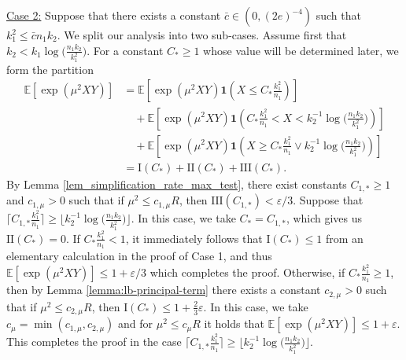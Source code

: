 \documentclass{article}
\newcommand{\EE}{\mathbb{E}}
\newcommand{\one}{\mathbf{1}}
\newcommand{\eps}{\varepsilon} %
\newcommand{\Ct}{C_{*}}
\begin{document}
\noindent \underline{Case 2:} Suppose that there exists a constant $\bar{c} \in (0, (2e)^{-4})$ such that $k_1^2 \leq \bar{c}n_1k_2$. We split our analysis into two sub-cases. Assume first that $k_2 < k_1\log\big(\frac{n_1k_2}{k_1^2}\big)$. For a constant $C_* \geq 1$ whose value will be determined later, we form the partition
\begin{align*}
    \EE[\exp(\mu^2XY)] &= \EE[\exp(\mu^2XY)\one(X \leq \Ct \frac{k_1^2}{n_1})] \\
    &\quad +  \EE[\exp(\mu^2XY)\one(\Ct \frac{k_1^2}{n_1} < X < k_2^{-1}\log\big(\frac{n_1k_2}{k_1^2}\big))] \\
    &\quad + \EE[\exp(\mu^2XY)\one(X \geq \Ct \frac{k_1^2}{n_1} \lor k_2^{-1}\log\big(\frac{n_1k_2}{k_1^2}\big) )] \\
    &= \text{I}(C_*) + \text{II}(C_*) + \text{III}(C_*).
\end{align*}
By Lemma \ref{lem_simplification_rate_max_test}, there exist constants $C_{1,*} \geq 1$ and $c_{1, \mu} > 0$ such that if $\mu^2 \leq c_{1, \mu}R$, then $\text{III}(C_{1,*}) < \eps/3$. Suppose that $\lceil C_{1,*}\frac{k_1^2}{n_1}\rceil \geq \lfloor k_2^{-1}\log \big(\frac{n_1k_2}{k_1^2}\big)\rfloor$. In this case, we take $C_* = C_{1,*}$, which gives us $\text{II}(C_*) = 0$. If $C_* \frac{k_1^2}{n_1} < 1$, it immediately follows that $\text{I}(C_*) \leq 1$ from an elementary calculation in the proof of Case 1, and thus $\EE[\exp(\mu^2XY)] \leq 1 + \eps/3$ which completes the proof. Otherwise, if $C_* \frac{k_1^2}{n_1} \geq 1$, then by Lemma \ref{lemma:lb-principal-term} there exists a constant $c_{2,\mu} > 0$ such that if $\mu^2 \leq c_{2,\mu}R$, then $\text{I}(C_*) \leq 1 + \frac23\eps$. In this case, we take $c_\mu = \min(c_{1, \mu}, c_{2, \mu})$ and for $\mu^2 \leq c_{\mu}R$ it holds that $\EE[\exp(\mu^2XY)]\leq 1 + \eps$. This completes the proof in the case $\lceil C_{1,*}\frac{k_1^2}{n_1}\rceil \geq \lfloor k_2^{-1}\log \big(\frac{n_1k_2}{k_1^2}\big)\rfloor$.
\end{document}
